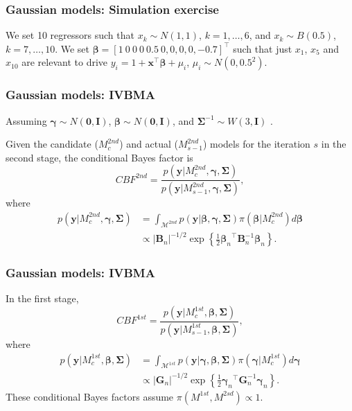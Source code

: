 \documentclass[12pt, compress]{beamer}
\begin{document}
\begin{frame}
	\frametitle{Gaussian models: Simulation exercise}
We set 10 regressors such that $x_k\sim N(1, 1)$, $k =1,\dots,6$, and $x_k\sim B(0.5)$, $k=7,\dots,10$. We set $\bm{\beta}=[1 \ 0 \ 0 \ 0 \ 0.5 \ 0, 0, 0, 0, -0.7]^{\top}$ such that just $x_1$, $x_5$ and $x_{10}$ are relevant to drive $y_i=1+\bm{x}^{\top}\bm{\beta}+\mu_i$, $\mu_i\sim N(0,0.5^2)$.
\end{frame}

\begin{frame}
	\frametitle{Gaussian models: IVBMA}
Assuming $\bm{\gamma}\sim {N}(\bm{0},\bm{I})$, $\bm{\beta}\sim {N}(\bm{0},\bm{I})$, and $\bm{\Sigma}^{-1} \sim {W}(3,\bm{I})$ \citep{Karl2012}.

Given the candidate ($M_{c}^{2nd}$) and actual ($M_{s-1}^{2nd}$) models for the iteration $s$ in the second stage, the conditional Bayes factor is 
\begin{equation*}
	CBF^{2nd}=\frac{p(\bm{y}|M_{c}^{2nd},\bm{\gamma},\bm{\Sigma})}{p(\bm{y}|M_{s-1}^{2nd},\bm{\gamma},\bm{\Sigma})},
\end{equation*}
where 
\begin{align*}
	p(\bm{y}|M_{c}^{2nd},\bm{\gamma},\bm{\Sigma})&=\int_{\mathcal{M}^{2nd}}p(\bm{y}|\bm{\beta},\bm{\gamma},\bm{\Sigma})\pi(\bm{\beta}|M_{c}^{2nd})d\bm{\beta}\\
	&\propto |\bm{B}_n|^{-1/2} \exp\left\{\frac{1}{2}{\bm{\beta}_n}^{\top}\bm{B}_n^{-1}\bm{\beta}_n\right\}
	.
\end{align*}
\end{frame}

\begin{frame}
	\frametitle{Gaussian models: IVBMA}
In the first stage,
\begin{equation*}
	CBF^{1st}=\frac{p(\bm{y}|M_{c}^{1st},\bm{\beta},\bm{\Sigma})}{p(\bm{y}|M_{s-1}^{1st},\bm{\beta},\bm{\Sigma})},
\end{equation*}
where \begin{align*}
	p(\bm{y}|M_{c}^{1st},\bm{\beta},\bm{\Sigma})&=\int_{\mathcal{M}^{1st}}p(\bm{y}|\bm{\gamma},\bm{\beta},\bm{\Sigma})\pi(\bm{\gamma}|M_{c}^{1st})d\bm{\gamma}\\
	&\propto |\bm{G}_n|^{-1/2} \exp\left\{\frac{1}{2}{\bm{\gamma}_n}^{\top}\bm{G}_n^{-1}\bm{\gamma}_n\right\}.
\end{align*}
These conditional Bayes factors assume $\pi(M^{1st},M^{2sd})\propto 1$.
\end{frame}
\end{document}

